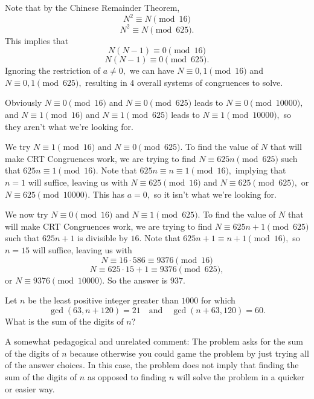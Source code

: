 \documentclass[mast]{lucky}
\begin{document}
\begin{sol}
Note that by the Chinese Remainder Theorem,
\[N^2\equiv N\pmod {16}\]
\[N^2\equiv N\pmod{625}.\]
This implies that
\[N(N-1)\equiv 0\pmod{16}\]
\[N(N-1)\equiv 0\pmod{625}.\]
Ignoring the restriction of $a\neq 0,$ we can have $N\equiv 0,1\pmod{16}$ and $N\equiv 0,1\pmod{625},$ resulting in $4$ overall systems of congruences to solve.

Obviously $N\equiv 0\pmod{16}$ and $N\equiv 0\pmod{625}$ leads to $N\equiv 0\pmod{10000},$ and $N\equiv 1\pmod{16}$ and $N\equiv 1\pmod{625}$ leads to $N\equiv 1\pmod{10000},$ so they aren't what we're looking for.

We try $N\equiv 1\pmod{16}$ and $N\equiv 0\pmod{625}.$ To find the value of $N$ that will make CRT Congruences work, we are trying to find $N\equiv 625n\pmod{625}$ such that $625n\equiv 1\pmod{16}.$ Note that $625n\equiv n\equiv 1\pmod{16},$ implying that $n=1$ will suffice, leaving us with $N\equiv 625\pmod{16}$ and $N\equiv 625\pmod{625},$ or $N\equiv 625\pmod{10000}.$ This has $a=0,$ so it isn't what we're looking for.

We now try $N\equiv 0\pmod{16}$ and $N\equiv 1\pmod{625}.$ To find the value of $N$ that will make CRT Congruences work, we are trying to find $N\equiv 625n+1\pmod{625}$ such that $625n+1$ is divisible by $16.$ Note that $625n+1\equiv n+1\pmod{16},$ so $n=15$ will suffice, leaving us with
\[N\equiv 16\cdot 586\equiv 9376\pmod{16}\]
\[N\equiv 625\cdot 15+1\equiv 9376\pmod{625},\]
or $N\equiv 9376\pmod{10000}.$ So the answer is $937.$
\end{sol}

\begin{exam}[AMC 10A 2020/24]
Let $n$ be the least positive integer greater than $1000$ for which\[\gcd(63, n+120) =21\quad \text{and} \quad \gcd(n+63, 120)=60.\]What is the sum of the digits of $n$?
\end{exam}

A somewhat pedagogical and unrelated comment: The problem asks for the sum of the digits of $n$ because otherwise you could game the problem by just trying all of the answer choices. In this case, the problem does not imply that finding the sum of the digits of $n$ as opposed to finding $n$ will solve the problem in a quicker or easier way.
\end{document}
